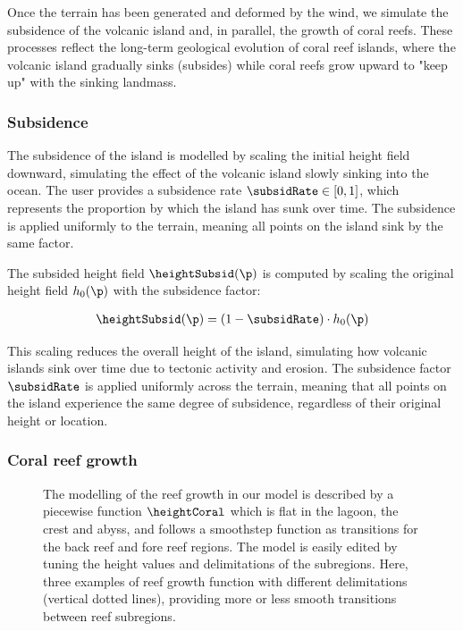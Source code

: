 Once the terrain has been generated and deformed by the wind, we simulate the subsidence of the volcanic island and, in parallel, the growth of coral reefs. These processes reflect the long-term geological evolution of coral reef islands, where the volcanic island gradually sinks (subsides) while coral reefs grow upward to "keep up" with the sinking landmass.

\subsubsection{Subsidence}
\label{sec:coral-island-subsidence}

The subsidence of the island is modelled by scaling the initial height field downward, simulating the effect of the volcanic island slowly sinking into the ocean. The user provides a subsidence rate $\subsidRate \in [0, 1]$, which represents the proportion by which the island has sunk over time. The subsidence is applied uniformly to the terrain, meaning all points on the island sink by the same factor.

The subsided height field $\heightSubsid(\p)$ is computed by scaling the original height field $h_0(\p)$ with the subsidence factor:

\begin{align}
\heightSubsid(\p) = (1 - \subsidRate) \cdot h_0(\p)
\end{align}

This scaling reduces the overall height of the island, simulating how volcanic islands sink over time due to tectonic activity and erosion. The subsidence factor $\subsidRate$ is applied uniformly across the terrain, meaning that all points on the island experience the same degree of subsidence, regardless of their original height or location.

\subsubsection{Coral reef growth}
\label{sec:coral-island-reef-growth}

\begin{figure}[H]
\caption{The modelling of the reef growth in our model is described by a piecewise function $\heightCoral$ which is flat in the lagoon, the crest and abyss, and follows a smoothstep function as transitions for the back reef and fore reef regions. The model is easily edited by tuning the height values and delimitations of the subregions. Here, three examples of reef growth function with different delimitations (vertical dotted lines), providing more or less smooth transitions between reef subregions.}
\label{fig:coral-island-reef-function}
\end{figure}

